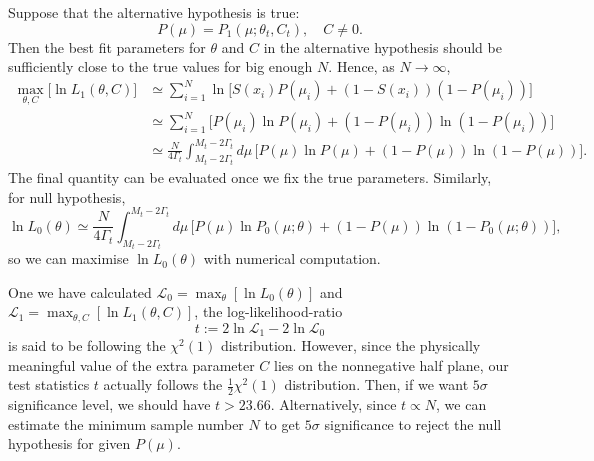 \documentclass[10pt]{article}
\theoremstyle{definition}
\theoremstyle{remark}
\begin{document}
	Suppose that the alternative hypothesis is true:
	\[P(\mu)=P_{1}(\mu;\theta_{t},C_{t}),\quad C\neq0.\]
	Then the best fit parameters for $\theta$ and $C$ in the alternative hypothesis should be sufficiently close to the true values for big enough $N$.
	Hence, as $N\to\infty$,
	\begin{align*}
		\max_{\theta,C}\Big[\ln L_{1}(\theta,C)\Big]&\simeq\sum_{i=1}^{N}\ln\Big[S(x_{i})P(\mu_{i})+(1-S(x_{i}))(1-P(\mu_{i}))\Big]\\
		&\simeq\sum_{i=1}^{N}\Big[P(\mu_{i})\ln P(\mu_{i})+(1-P(\mu_{i}))\ln(1-P(\mu_{i}))\Big]\\
		&\simeq\frac{N}{4\Gamma_{t}}\int_{M_{t}-2\Gamma_{t}}^{M_{t}-2\Gamma_{t}}d\mu\,\Big[P(\mu)\ln P(\mu)+(1-P(\mu))\ln(1-P(\mu))\Big].
	\end{align*}
	The final quantity can be evaluated once we fix the true parameters.
	Similarly, for null hypothesis,
	\[\ln L_{0}(\theta)\simeq\frac{N}{4\Gamma_{t}}\int_{M_{t}-2\Gamma_{t}}^{M_{t}-2\Gamma_{t}}d\mu\,\Big[P(\mu)\ln P_{0}(\mu;\theta)+(1-P(\mu))\ln(1-P_{0}(\mu;\theta))\Big],\]
	so we can maximise $\ln L_{0}(\theta)$ with numerical computation.
	
	One we have calculated $\mathcal{L}_{0}=\max_{\theta}[\ln L_{0}(\theta)]$ and $\mathcal{L}_{1}=\max_{\theta,C}[\ln L_{1}(\theta,C)]$, the log-likelihood-ratio
	\[t:=2\ln\mathcal{L}_{1}-2\ln\mathcal{L}_{0}\]
	is said to be following the $\chi^{2}(1)$ distribution.
	However, since the physically meaningful value of the extra parameter $C$ lies on the nonnegative half plane, our test statistics $t$ actually follows the $\frac{1}{2}\chi^{2}(1)$ distribution\cite{cowan2011asymptotic}.
	Then, if we want $5\sigma$ significance level, we should have $t>23.66$.
	Alternatively, since $t\propto N$, we can estimate the minimum sample number $N$ to get $5\sigma$ significance to reject the null hypothesis for given $P(\mu)$.
	
	
	
	
\end{document}
